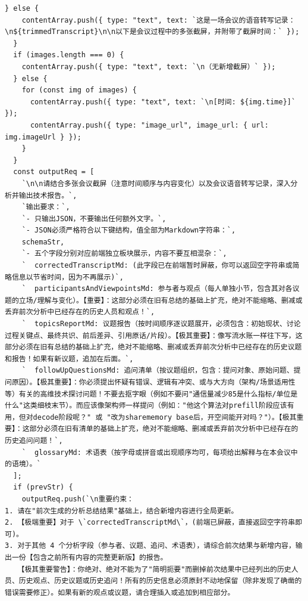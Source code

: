 \documentclass[12pt,a4paper]{article}
\begin{document}
\begin{Verbatim}[fontsize=\footnotesize]
  } else {
    contentArray.push({ type: "text", text: `这是一场会议的语音转写记录：\n${trimmedTranscript}\n\n以下是会议过程中的多张截屏，并附带了截屏时间：` });
  }
  if (images.length === 0) {
    contentArray.push({ type: "text", text: `\n（无新增截屏）` });
  } else {
    for (const img of images) {
      contentArray.push({ type: "text", text: `\n[时间: ${img.time}]` });
      contentArray.push({ type: "image_url", image_url: { url: img.imageUrl } });
    }
  }
  const outputReq = [
    `\n\n请结合多张会议截屏（注意时间顺序与内容变化）以及会议语音转写记录，深入分析并输出技术报告。`,
    `输出要求：`,
    `- 只输出JSON，不要输出任何额外文字。`,
    `- JSON必须严格符合以下键结构，值全部为Markdown字符串：`,
    schemaStr,
    `- 五个字段分别对应前端独立板块展示，内容不要互相混杂：`,
    `  correctedTranscriptMd: (此字段已在前端暂时屏蔽，你可以返回空字符串或简略信息以节省时间，因为不再展示)`,
    `  participantsAndViewpointsMd: 参与者与观点（每人单独小节，包含其对各议题的立场/理解与变化）。【重要】：这部分必须在旧有总结的基础上扩充，绝对不能缩略、删减或丢弃前次分析中已经存在的历史人员和观点！`,
    `  topicsReportMd: 议题报告（按时间顺序逐议题展开，必须包含：初始现状、讨论过程关键点、最终共识、前后差异、引用原话/片段）。【极其重要】：像写流水账一样往下写，这部分必须在旧有总结的基础上扩充，绝对不能缩略、删减或丢弃前次分析中已经存在的历史议题和报告！如果有新议题，追加在后面。`,
    `  followUpQuestionsMd: 追问清单（按议题组织，包含：提问对象、原始问题、提问原因）。【极其重要】：你必须提出怀疑有错误、逻辑有冲突、或与大方向（架构/场景适用性等）有关的高维技术探讨问题！不要去抠字眼（例如不要问"通信量减少85是什么指标/单位是什么"这类细枝末节）。而应该像架构师一样提问（例如："他这个算法对prefill阶段应该有用，但对decode阶段呢？" 或 "改为sharememory base后，开空间能开对吗？"）。【极其重要】：这部分必须在旧有清单的基础上扩充，绝对不能缩略、删减或丢弃前次分析中已经存在的历史追问问题！`,
    `  glossaryMd: 术语表（按字母或拼音或出现顺序均可，每项给出解释与在本会议中的语境）。`
  ];
  if (prevStr) {
    outputReq.push(`\n重要约束：
1. 请在"前次生成的分析总结结果"基础上，结合新增内容进行全局更新。
2. 【极端重要】对于 \`correctedTranscriptMd\`，(前端已屏蔽，直接返回空字符串即可)。
3. 对于其他 4 个分析字段（参与者、议题、追问、术语表），请综合前次结果与新增内容，输出一份【包含之前所有内容的完整更新版】的报告。
   【极其重要警告】：你绝对、绝对不能为了"简明扼要"而删掉前次结果中已经列出的历史人员、历史观点、历史议题或历史追问！所有的历史信息必须原封不动地保留（除非发现了确凿的错误需要修正）。如果有新的观点或议题，请合理插入或追加到相应部分。

\end{Verbatim}
\end{document}
